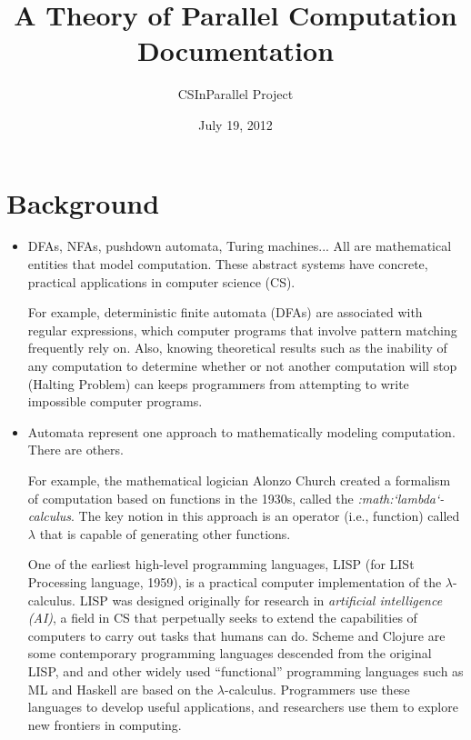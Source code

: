 \documentclass[letterpaper,10pt,openany,oneside]{sphinxmanual}
\title{A Theory of Parallel Computation Documentation}
\date{July 19, 2012}
\author{CSInParallel Project}
\begin{document}
\maketitle
\tableofcontents
{}\label{index::doc}



\chapter{Background}
\label{Background/Background::doc}\label{Background/Background:a-theory-of-parallel-computation}\label{Background/Background:background}\begin{itemize}
\item {} 
DFAs, NFAs, pushdown automata, Turing machines... All are mathematical entities that model computation. These abstract systems have concrete, practical applications in computer science (CS).

For example, deterministic finite automata (DFAs) are associated with regular expressions, which computer   programs that involve pattern matching frequently rely on. Also, knowing theoretical results such as the inability of any computation to determine whether or not another computation will stop (Halting Problem) can keeps programmers from attempting to write impossible computer programs.

\item {} 
Automata represent one approach to mathematically modeling computation. There are others.

For example, the mathematical logician Alonzo Church created a formalism of computation based on functions in the 1930s, called the \emph{:math:{}`lambda{}`-calculus}. The key notion in this approach is an operator (i.e., function) called $\lambda$ that is capable of generating other functions.

One of the earliest high-level programming languages, LISP (for LISt Processing language, 1959), is a practical computer implementation of the $\lambda$-calculus. LISP was designed originally for research in \emph{artificial intelligence (AI)}, a field in CS that perpetually seeks to extend the capabilities of computers to carry out tasks that humans can do. Scheme and Clojure are some contemporary programming languages descended from the original LISP, and and other widely used ``functional'' programming languages such as ML and Haskell are based on the $\lambda$-calculus. Programmers use these languages to develop useful applications, and researchers use them to explore new frontiers in computing.


\end{itemize}
\end{document}
